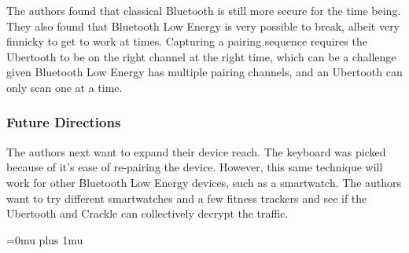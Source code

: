 \noindent
The authors found that classical Bluetooth is still more secure for the time being.  They also found that Bluetooth Low Energy is very possible to break, albeit very finnicky to get to work at times.  Capturing a pairing sequence requires the Ubertooth to be on the right channel at the right time, which can be a challenge given Bluetooth Low Energy has multiple pairing channels, and an Ubertooth can only scan one at a time.

\subsubsection{Future Directions}

\noindent
The authors next want to expand their device reach.  The keyboard was picked because of it's ease of re-pairing the device.  However, this same technique will work for other Bluetooth Low Energy devices, such as a smartwatch.  The authors want to try different smartwatches and a few fitness trackers and see if the Ubertooth and Crackle can collectively decrypt the traffic.

\Urlmuskip=0mu plus 1mu\relax



\pagebreak